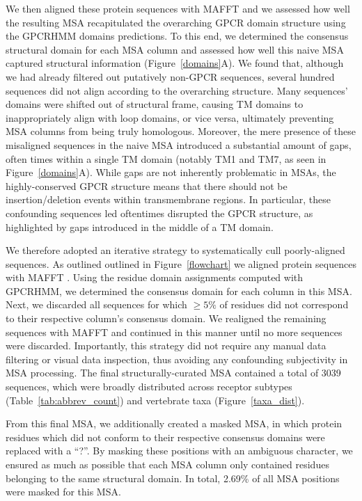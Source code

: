 \documentclass[fleqn,10pt]{wlpeerj}
\begin{document}
We then aligned these protein sequences with MAFFT \citep{mafftv7} and we assessed how well the resulting MSA recapitulated the overarching GPCR domain structure using the GPCRHMM domains predictions. To this end, we determined the consensus structural domain for each MSA column and assessed how well this naive MSA captured structural information (Figure~\ref{domains}A). We found that, although we had already filtered out putatively non-GPCR sequences, several hundred sequences did not align according to the overarching structure. Many sequences' domains were shifted out of structural frame, causing TM domains to inappropriately align with loop domains, or vice versa, ultimately preventing MSA columns from being truly homologous. Moreover, the mere presence of these misaligned sequences in the naive MSA introduced a substantial amount of gaps, often times within a single TM domain (notably TM1 and TM7, as seen in Figure~\ref{domains}A). While gaps are not inherently problematic in MSAs, the highly-conserved GPCR structure means that there should not be insertion/deletion events within transmembrane regions. In particular, these confounding sequences led oftentimes disrupted the GPCR structure, as highlighted by gaps introduced in the middle of a TM domain.

We therefore adopted an iterative strategy to systematically cull poorly-aligned sequences. As outlined outlined in Figure~\ref{flowchart} we aligned protein sequences with MAFFT \citep{mafftv7}. Using the residue domain assignments computed with GPCRHMM, we determined the consensus domain for each column in this MSA. Next, we discarded all sequences for which $\geq 5\%$ of residues did not correspond to their respective column's consensus domain. We realigned the remaining sequences with MAFFT and continued in this manner until no more sequences were discarded. Importantly, this strategy did not require any manual data filtering or visual data inspection, thus avoiding any confounding subjectivity in MSA processing. The final structurally-curated MSA contained a total of 3039 sequences, which were broadly distributed across receptor subtypes (Table~\ref{tab:abbrev_count}) and vertebrate taxa (Figure~\ref{taxa_dist}). 

From this final MSA, we additionally created a masked MSA, in which protein residues which did not conform to their respective consensus domains were replaced with a ``?''. By masking these positions with an ambiguous character, we ensured as much as possible that each MSA column only contained residues belonging to the same structural domain. In total, 2.69\% of all MSA positions were masked for this MSA.
\end{document}
